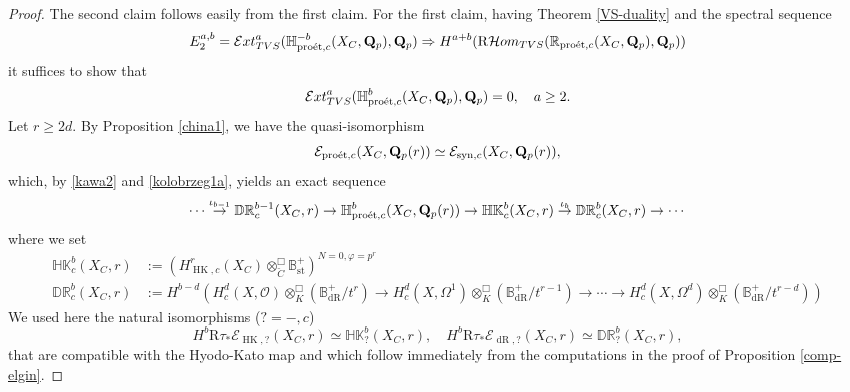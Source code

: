 \documentclass[10pt,reqno]{amsart}
\let\cal\mathcal
\theoremstyle{definition}
\theoremstyle{remark}
\def\phi{\varphi}
\newcommand{\dr}{\operatorname{dR} }
\newcommand{\proeet}{\operatorname{pro\acute{e}t} }
\newcommand{\Hhom}{{\cal Hom}}
\newcommand{\synt}{ \operatorname{syn} }
\newcommand{\st}{\operatorname{st} }
\newcommand{\hk}{\operatorname{HK} }
\newcommand{\so}{{\mathcal O}}
\newcommand{\se}{{\mathcal{E}}}
\numberwithin{equation}{section}
\def\R{{\mathrm R}}
\def\Q{{\bf Q}} \def\Z{{\bf Z}}
\numberwithin{equation}{section}
\begin{document}
\begin{proof} The second claim follows easily from the first claim. For the first claim, 
having Theorem \ref{VS-duality} and the spectral sequence 
$$
E^{a,b}_2={\mathcal Ext}^a_{\rm TVS}({\mathbb H}^{-b}_{\proeet,c}(X_C,\Q_p),\Q_p)\Rightarrow H^{a+b}(\R\Hhom_{\rm TVS}({\mathbb R}_{\proeet,c}(X_C,\Q_p),\Q_p))
$$
it suffices to show that
 \begin{equation} \label{vanishing}
{\mathcal Ext}^a_{\rm TVS}({\mathbb H}^{b}_{\proeet,c}(X_C,\Q_p),\Q_p)=0,\quad a\geq 2.
\end{equation}
   Let $r\geq 2d$. By Proposition \ref{china1}, we have the quasi-isomorphism
  $$
 \se_{\proeet,c}(X_C,\Q_p(r))\simeq \se_{\synt,c}(X_C,\Q_p(r)),
  $$
  which, by \eqref{kawa2}  and \eqref{kolobrzeg1a},   yields an exact sequence 
  \begin{equation}\label{presentation1}
\cdots\stackrel{\iota_{b-1}}{\to}{\mathbb  D}{\mathbb R}^{b-1}_c(X_C,r)  \stackrel{}{\to} {\mathbb H}^b_{\proeet,c}(X_C,\Q_p(r))\stackrel{}{\to} {\mathbb H}{\mathbb K}^b_c(X_C,r)\stackrel{\iota_b}{\to}{\mathbb  D}{\mathbb R}^{b}_c(X_C,r)\to\cdots
  \end{equation}
  where we set 
  \begin{align*}
  {\mathbb H}{\mathbb K}^b_c(X_C,r) & := (H^r_{\hk,c}(X_C)\otimes^{{\Box}}_{\breve{C}}\mathbb{B}^+_{\st})^{N=0,\phi=p^r}\\
  {\mathbb D}{\mathbb R}^b_c(X_C,r) & :=H^{b-d}(H^d_c(X,\so)\otimes^{{\Box}}_{K}(\mathbb{B}^+_{\dr}/t^{r})\to H^d_c(X,\Omega^1)\otimes^{{\Box}}_{K}(\mathbb{B}^+_{\dr}/t^{r-1})\to\cdots\to H^d_c(X,\Omega^d)\otimes^{{\Box}}_{K}(\mathbb{B}^+_{\dr}/t^{r-d})) 
  \end{align*}
  We used here the natural isomorphisms ($?=-, c$)
  $$H^b\R\tau_*\se_{\hk,?}(X_C,r)\simeq \mathbb{HK}^b_?(X_C,r), \quad H^b\R\tau_*\se_{\dr,?}(X_C,r)\simeq \mathbb{DR}^b_?(X_C,r),
  $$
  that are compatible with the Hyodo-Kato map and which 
    follow immediately from the computations in the proof of Proposition \ref{comp-elgin}.
 

\end{proof}
\end{document}
